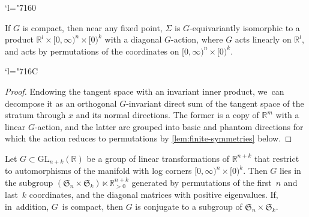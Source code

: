 \documentclass[JEP,XML,SOM,Unicode,NoFloatCountersInSection,published]{cedram}
\newcommand{\Changel}{\mathcode`l="7160}
\newcommand{\Changelback}{\mathcode`l="716C}
\theoremstyle{definition}
\theoremstyle{remark}
\newcommand{\RR}{\mathbb{R}}
\newcommand{\model}[2]{\halfspc{#1}\times[0)^{#2}}
\newcommand{\halfspc}[1]{[0,\infty)^{#1}}
\newcommand{\Sig}{\Sigma}
\newcommand{\GL}[2]{\mathrm{GL}_{#1}(#2)}
\newcommand{\symgp}[1]{\mathfrak{S}_{#1}}
\begin{document}
\Changel
\begin{corollary}\label{cor:local-action}
If $G$ is compact, then near any fixed point, $\Sig$ is $G$\nobreakdash-equivariantly isomorphic to a product $\RR^l \times \model{n}{k}$ with a diagonal $G$\nobreakdash-action, where $G$ acts linearly on $\RR^l$, and acts by permutations of the coordinates on $\model{n}{k}$.
\end{corollary}
\Changelback

\begin{proof}
Endowing the tangent space with an invariant inner product, we~can decompose it as an orthogonal $G$\nobreakdash-invariant direct sum of the tangent space of the stratum through $x$ and its normal directions. The former is a copy of $\RR^m$ with a linear $G$\nobreakdash-action, and the latter are grouped into basic and phantom directions for which the action reduces to permutations by \autoref{lem:finite-symmetries} below.
\end{proof}

\begin{lemma}\label{lem:finite-symmetries}
Let $G \subset \GL{n+k}{\RR}$ be a group of linear transformations of $\RR^{n+k}$ that restrict to automorphisms of the manifold with log corners $\model{n}{k}$. Then $G$ lies in the subgroup $(\symgp{n}\times\symgp{k})\ltimes \RR_{>0}^{n+k}$ generated by permutations of the first~$n$ and last~$k$ coordinates, and the diagonal matrices with positive eigenvalues. If, in~addition, $G$~is compact, then $G$ is conjugate to a subgroup of $\symgp{n}\times\symgp{k}$.
\end{lemma}
\end{document}
